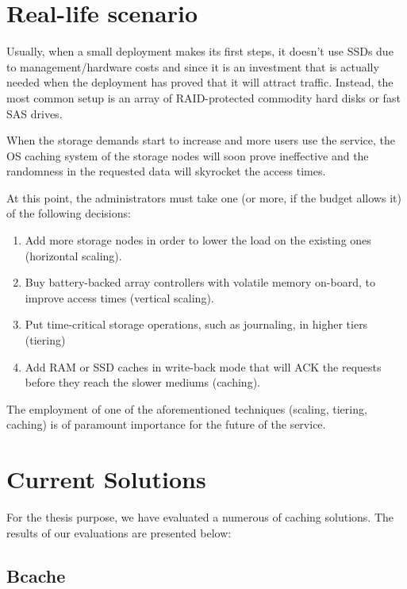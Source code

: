\section{Real-life scenario}\label{sec:real-life-triad}

Usually, when a small deployment makes its first steps, it doesn't use SSDs due 
to management/hardware costs and since it is an investment that is actually 
needed when the deployment has proved that it will attract traffic. Instead, 
the most common setup is an array of RAID-protected commodity hard disks or 
fast SAS drives.

When the storage demands start to increase and more users use the service, the 
OS caching system of the storage nodes will soon prove ineffective and the 
randomness in the requested data will skyrocket the access times.

At this point, the administrators must take one (or more, if the budget allows 
it) of the following decisions:

\begin{enumerate}
	\item Add more storage nodes in order to lower the load on the existing 
		ones (horizontal scaling).
	\item Buy battery-backed array controllers with volatile memory on-board, 
		to improve access times (vertical scaling).
	\item Put time-critical storage operations, such as journaling, in higher 
		tiers (tiering)
	\item Add RAM or SSD caches in write-back mode that will ACK the requests 
		before they reach the slower mediums (caching).
\end{enumerate}

The employment of one of the aforementioned techniques (scaling, tiering, 
caching) is of paramount importance for the future of the service.

\section{Current Solutions}\label{sec:solutions-triad}

For the thesis purpose, we have evaluated a numerous of caching solutions. The 
results of our evaluations are presented below:

\subsection{Bcache}

